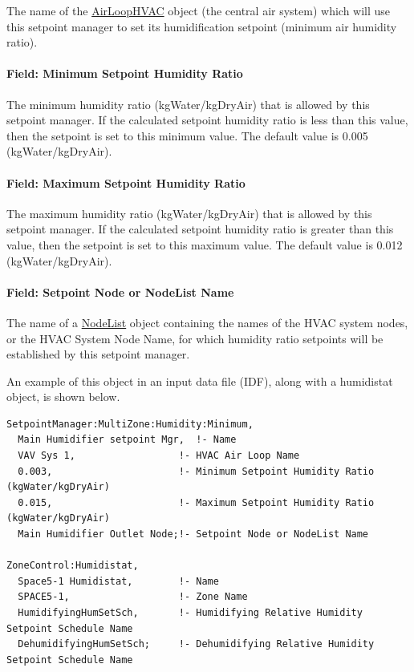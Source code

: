 The name of the \hyperref[airloophvac]{AirLoopHVAC} object (the central air system) which will use this setpoint manager to set its humidification setpoint (minimum air humidity ratio).

\paragraph{Field: Minimum Setpoint Humidity Ratio}\label{field-minimum-setpoint-humidity-ratio-3}

The minimum humidity ratio (kgWater/kgDryAir) that is allowed by this setpoint manager. If the calculated setpoint humidity ratio is less than this value, then the setpoint is set to this minimum value. The default value is 0.005 (kgWater/kgDryAir).

\paragraph{Field: Maximum Setpoint Humidity Ratio}\label{field-maximum-setpoint-humidity-ratio-3}

The maximum humidity ratio (kgWater/kgDryAir) that is allowed by this setpoint manager. If the calculated setpoint humidity ratio is greater than this value, then the setpoint is set to this maximum value. The default value is 0.012 (kgWater/kgDryAir).

\paragraph{Field: Setpoint Node or NodeList Name}\label{field-setpoint-node-or-nodelist-name-17}

The name of a \hyperref[nodelist]{NodeList} object containing the names of the HVAC system nodes, or the HVAC System Node Name, for which humidity ratio setpoints will be established by this setpoint manager.

An example of this object in an input data file (IDF), along with a humidistat object, is shown below.

\begin{lstlisting}
SetpointManager:MultiZone:Humidity:Minimum,
  Main Humidifier setpoint Mgr,  !- Name
  VAV Sys 1,                  !- HVAC Air Loop Name
  0.003,                      !- Minimum Setpoint Humidity Ratio (kgWater/kgDryAir)
  0.015,                      !- Maximum Setpoint Humidity Ratio (kgWater/kgDryAir)
  Main Humidifier Outlet Node;!- Setpoint Node or NodeList Name

ZoneControl:Humidistat,
  Space5-1 Humidistat,        !- Name
  SPACE5-1,                   !- Zone Name
  HumidifyingHumSetSch,       !- Humidifying Relative Humidity Setpoint Schedule Name
  DehumidifyingHumSetSch;     !- Dehumidifying Relative Humidity Setpoint Schedule Name
\end{lstlisting}

